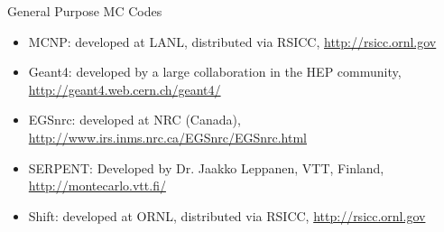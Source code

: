 \documentclass[xcolor=x11names,compress]{beamer}
\renewcommand{\(}{\begin{columns}}
\renewcommand{\)}{\end{columns}}
\newcommand{\<}[1]{\begin{column}{#1}}
\renewcommand{\>}{\end{column}}
\begin{document}
\begin{frame}{General Purpose MC Codes}

\begin{itemize}
\item \alert{MCNP}: developed at LANL, distributed via RSICC, \href{http://rsicc.ornl.gov}{http://rsicc.ornl.gov}
%

\item \alert{Geant4}: developed by a large collaboration in the HEP community, \href{ http://geant4.web.cern.ch/geant4/}{http://geant4.web.cern.ch/geant4/}

\item \alert{EGSnrc}: developed at NRC (Canada), \href{http://www.irs.inms.nrc.ca/EGSnrc/EGSnrc.html}{http://www.irs.inms.nrc.ca/EGSnrc/EGSnrc.html}

\item \alert{SERPENT}: Developed by Dr. Jaakko Leppanen, VTT, Finland, \href{ http://montecarlo.vtt.fi/}{http://montecarlo.vtt.fi/}

\item \alert{Shift}: developed at ORNL, distributed via RSICC, \href{http://rsicc.ornl.gov}{http://rsicc.ornl.gov}

\end{itemize}

\end{frame}
\end{document}
